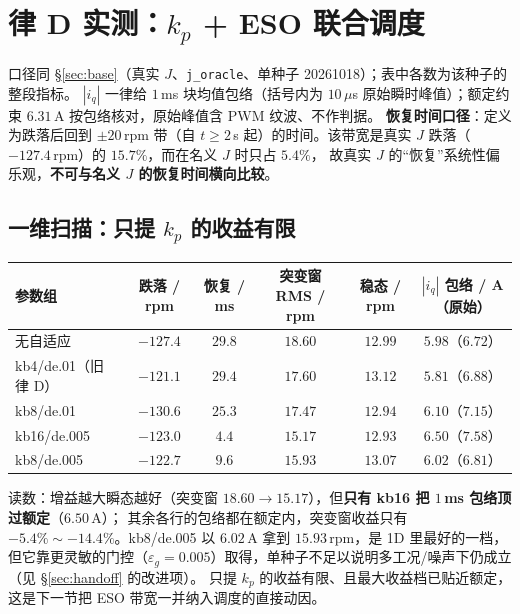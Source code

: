 \documentclass[11pt,a4paper]{article}
\theoremstyle{remark}\newtheorem{remark}{注}
\begin{document}
\section{律 D 实测：$k_p$ + ESO 联合调度}\label{sec:lawd-res}
\noindent 口径同 §\ref{sec:base}（真实 $J$、\texttt{j\_oracle}、单种子 20261018）；表中各数为该种子的整段指标。
$|i_q|$ 一律给 $1$\,ms 块均值包络（括号内为 $10$\,$\mu$s 原始瞬时峰值）；额定约束 $6.31$\,A 按包络核对，原始峰值含 PWM 纹波、不作判据。
\textbf{恢复时间口径}：定义为跌落后回到 $\pm20$\,rpm 带（自 $t\ge2$\,s 起）的时间。该带宽是真实 $J$ 跌落（$-127.4$\,rpm）的 $15.7\%$，而在名义 $J$ 时只占 $5.4\%$，
故真实 $J$ 的“恢复”系统性偏乐观，\textbf{不可与名义 $J$ 的恢复时间横向比较}。

\subsection{一维扫描：只提 $k_p$ 的收益有限}\label{sec:lawd-1d}
\begin{center}\footnotesize
\begin{tabular}{@{}lccccc@{}}
\toprule
参数组 & 跌落 / rpm & 恢复 / ms & 突变窗 RMS / rpm & 稳态 / rpm & $|i_q|$ 包络 / A（原始）\\
\midrule
无自适应 & $-127.4$ & $29.8$ & $18.60$ & $12.99$ & $5.98$（$6.72$）\\
kb4/de.01（旧律 D） & $-121.1$ & $29.4$ & $17.60$ & $13.12$ & $5.81$（$6.88$）\\
kb8/de.01 & $-130.6$ & $25.3$ & $17.47$ & $12.94$ & $6.10$（$7.15$）\\
kb16/de.005 & $-123.0$ & $4.4$ & $15.17$ & $12.93$ & $6.50$（$7.58$）\\
kb8/de.005 & $-122.7$ & $9.6$ & $15.93$ & $13.07$ & $6.02$（$6.81$）\\
\bottomrule
\end{tabular}
\end{center}
读数：增益越大瞬态越好（突变窗 $18.60\to15.17$），但\textbf{只有 kb16 把 $1$\,ms 包络顶过额定}（$6.50$\,A）；
其余各行的包络都在额定内，突变窗收益只有 $-5.4\%\sim-14.4\%$。kb8/de.005 以 $6.02$\,A 拿到 $15.93$\,rpm，是 1D 里最好的一档，
但它靠更灵敏的门控（$\varepsilon_g=0.005$）取得，单种子不足以说明多工况/噪声下仍成立（见 §\ref{sec:handoff} 的改进项）。
只提 $k_p$ 的收益有限、且最大收益档已贴近额定，这是下一节把 ESO 带宽一并纳入调度的直接动因。
\end{document}
